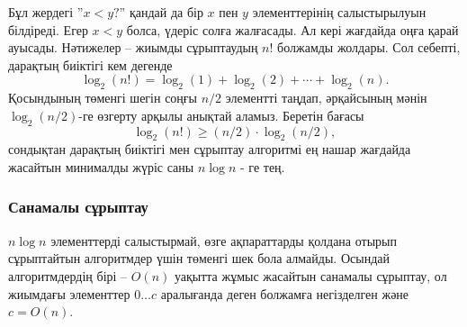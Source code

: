 \begin{center}
\end{center}

Бұл жердегі ''$x<y?$'' қандай да бір
$x$ пен $y$ элементтерінің салыстырылуын білдіреді.
Егер $x<y$ болса, үдеріс солға жалғасады.
Ал кері жағдайда оңға қарай ауысады.
Нәтижелер -- жиымды сұрыптаудың $n!$ болжамды жолдары.
Сол себепті, дарақтың биіктігі кем дегенде
\[ \log_2(n!) = \log_2(1)+\log_2(2)+\cdots+\log_2(n).\]
Қосындының төменгі шегін соңғы $n/2$ элементті таңдап,
әрқайсының мәнін $\log_2(n/2)$-ге өзгерту арқылы анықтай аламыз.
Беретін бағасы
\[ \log_2(n!) \ge (n/2) \cdot \log_2(n/2),\]
сондықтан дарақтың биіктігі мен сұрыптау
алгоритмі ең нашар жағдайда жасайтын 
минималды жүріс саны $n \log n$ - ге тең.

\subsubsection{Санамалы сұрыптау}

$n \log n$ элементтерді салыстырмай,
өзге ақпараттарды қолдана отырып сұрыптайтын алгоритмдер
үшін төменгі шек бола алмайды.
Осындай алгоритмдердің бірі -- $O(n)$ уақытта жұмыс жасайтын
санамалы сұрыптау, ол жиымдағы элементтер $0 \ldots c$ 
аралығанда деген болжамға негізделген және $c=O(n)$.

